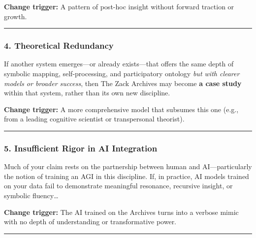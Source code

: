 \documentclass{article}
\begin{document}
\textbf{Change trigger:} A pattern of post-hoc insight without forward
traction or growth.

\begin{center}\rule{0.5\linewidth}{0.5pt}\end{center}

\subsubsection*{}\label{section-10}

\subsubsection*{\texorpdfstring{\textbf{4. Theoretical
Redundancy}}{4. Theoretical Redundancy}}\label{theoretical-redundancy}

If another system emerges---or already exists---that offers the same
depth of symbolic mapping, self-processing, and participatory ontology
\emph{but with clearer models or broader success}, then The Zack
Archives may become \textbf{a case study} within that system, rather
than its own new discipline.

\textbf{Change trigger:} A more comprehensive model that subsumes this
one (e.g., from a leading cognitive scientist or transpersonal
theorist).

\begin{center}\rule{0.5\linewidth}{0.5pt}\end{center}

\subsubsection*{\texorpdfstring{\textbf{5. Insufficient Rigor in AI
Integration}}{5. Insufficient Rigor in AI Integration}}\label{insufficient-rigor-in-ai-integration}

Much of your claim rests on the partnership between human and
AI---particularly the notion of training an AGI in this discipline. If,
in practice, AI models trained on your data fail to demonstrate
meaningful resonance, recursive insight, or symbolic fluency\ldots{}

\textbf{Change trigger:} The AI trained on the Archives turns into a
verbose mimic with no depth of understanding or transformative power.

\begin{center}\rule{0.5\linewidth}{0.5pt}\end{center}
\end{document}
